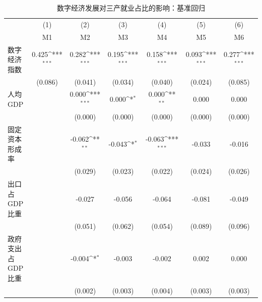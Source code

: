 \begin{table}[htbp]\centering
\def\sym#1{\ifmmode^{#1}\else\(^{#1}\)\fi}
\caption{数字经济发展对三产就业占比的影响：基准回归\label{tab:main}}
\begin{tabular}{l*{6}{c}}
\toprule
                    &\multicolumn{1}{c}{(1)}&\multicolumn{1}{c}{(2)}&\multicolumn{1}{c}{(3)}&\multicolumn{1}{c}{(4)}&\multicolumn{1}{c}{(5)}&\multicolumn{1}{c}{(6)}\\
                    &\multicolumn{1}{c}{M1}&\multicolumn{1}{c}{M2}&\multicolumn{1}{c}{M3}&\multicolumn{1}{c}{M4}&\multicolumn{1}{c}{M5}&\multicolumn{1}{c}{M6}\\
\midrule
数字经济指数        &       0.425\sym{***}&       0.282\sym{***}&       0.195\sym{***}&       0.158\sym{***}&       0.093\sym{***}&       0.277\sym{***}\\
                    &     (0.086)         &     (0.041)         &     (0.034)         &     (0.040)         &     (0.024)         &     (0.085)         \\
\addlinespace
人均GDP             &                     &       0.000\sym{***}&       0.000\sym{*}  &       0.000\sym{**} &       0.000         &       0.000         \\
                    &                     &     (0.000)         &     (0.000)         &     (0.000)         &     (0.000)         &     (0.000)         \\
\addlinespace
固定资本形成率      &                     &      -0.062\sym{**} &      -0.043\sym{*}  &      -0.063\sym{***}&      -0.033         &      -0.016         \\
                    &                     &     (0.029)         &     (0.023)         &     (0.022)         &     (0.024)         &     (0.026)         \\
\addlinespace
出口占GDP比重       &                     &      -0.027         &      -0.056         &      -0.064         &      -0.081         &      -0.049         \\
                    &                     &     (0.051)         &     (0.062)         &     (0.054)         &     (0.089)         &     (0.096)         \\
\addlinespace
政府支出占GDP比重   &                     &      -0.004\sym{*}  &      -0.003         &      -0.002         &       0.002         &       0.000         \\
                    &                     &     (0.002)         &     (0.003)         &     (0.004)         &     (0.003)         &     (0.003)         \\

\end{tabular}
\end{table}
